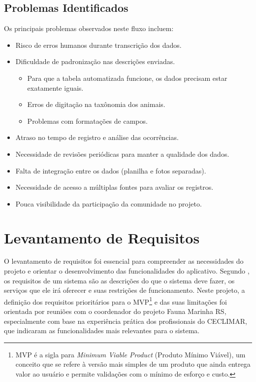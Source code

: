 \subsection{Problemas Identificados}

Os principais problemas observados neste fluxo incluem:

\begin{itemize}
    \item Risco de erros humanos durante transcrição dos dados.
    
    \item Dificuldade de padronização nas descrições enviadas.
    \begin{itemize}
        \item Para que a tabela automatizada funcione, os dados precisam estar exatamente iguais.
        \item Erros de digitação na taxônomia dos animais.
        \item Problemas com formatações de campos.
    \end{itemize}
    
    \item Atraso no tempo de registro e análise das ocorrências.
    
    \item Necessidade de revisões periódicas para manter a qualidade dos dados.
    
    \item Falta de integração entre os dados (planilha e fotos separadas).
    
    \item Necessidade de acesso a múltiplas fontes para avaliar os registros.
    
    \item Pouca visibilidade da participação da comunidade no projeto.
\end{itemize}


\section{Levantamento de Requisitos}

O levantamento de requisitos foi essencial para compreender as necessidades do projeto e orientar o 
desenvolvimento das funcionalidades do aplicativo. Segundo 
, os requisitos de um sistema são as descrições do que o sistema deve 
fazer, os serviços que ele irá oferecer e suas restrições de funcionamento. Neste projeto, a 
definição dos requisitos prioritários para o MVP\footnote{MVP é a sigla para 
\textit{Minimum Viable Product} (Produto Mínimo Viável), um conceito que se refere à 
versão mais simples de um produto 
que ainda entrega valor ao usuário e permite validações com o mínimo de esforço e 
custo.} e das suas limitações foi orientada por reuniões 
com o coordenador do projeto Fauna Marinha RS, especialmente com base na experiência prática dos 
profissionais do CECLIMAR, que indicaram as funcionalidades mais relevantes para o sistema.

